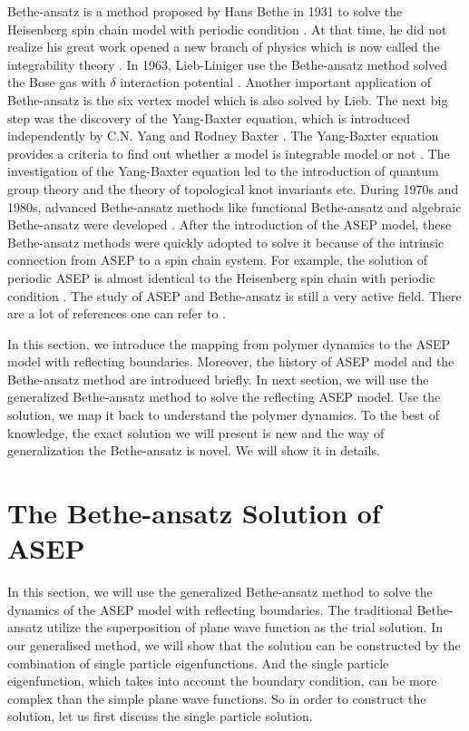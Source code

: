 Bethe-ansatz is a method proposed by Hans Bethe in 1931 to solve the Heisenberg spin chain model with periodic condition \cite{Bethe1931}. At that time, he did not realize his great work opened a new branch of physics which is now called the integrability theory \cite{Batchelor2007}. In 1963, Lieb-Liniger use the Bethe-ansatz method solved the Bose gas with $\delta$ interaction potential \cite{Lieb1963a,Lieb1963}. Another important application of Bethe-ansatz is the six vertex model which is also solved by Lieb. The next big step was the discovery of the Yang-Baxter equation, which is introduced independently by C.N. Yang and Rodney Baxter \cite{Yang1967,Baxter1972}. The Yang-Baxter equation provides a criteria to find out whether a model is integrable model or not \cite{Batchelor2007}. The investigation of the Yang-Baxter equation led to the introduction of quantum group theory and the theory of topological knot invariants etc. During 1970s and 1980s, advanced Bethe-ansatz methods like functional Bethe-ansatz  and algebraic Bethe-ansatz were developed \cite{Mallick2011b}. After the introduction of the ASEP model, these Bethe-ansatz methods were quickly adopted to solve it because of the intrinsic connection from ASEP to a spin chain system. For example, the solution of periodic ASEP is almost identical to the Heisenberg spin chain with periodic condition \cite{Mallick2011b}. The study of ASEP and Bethe-ansatz is still a very active field. There are a lot of references one can refer to \cite{Derrida1998,Liggett1999,Schutz2001,Golinelli2006,Mallick2011b}. 

In this section, we introduce the mapping from polymer dynamics to the ASEP model with reflecting boundaries. Moreover, the history of ASEP model and the Bethe-ansatz method are introduced briefly. In next section, we will use the generalized Bethe-ansatz method to solve the reflecting ASEP model. Use the solution, we map it back to understand the polymer dynamics. To the best of knowledge, the exact solution we will present is new and the way of generalization the Bethe-ansatz is novel. We will show it in details. 


\section{The Bethe-ansatz Solution of ASEP}
\label{sec:the_bethe_ansatz_solution_of_asep}
In this section, we will use the generalized Bethe-ansatz method to solve the dynamics of the ASEP model with reflecting boundaries. The traditional Bethe-ansatz utilize the superposition of plane wave function as the trial solution. In our generalised method, we will show that the solution can be constructed by the combination of single particle eigenfunctions. And the single particle eigenfunction, which takes into account the boundary condition, can be more complex than the simple plane wave functions. So in order to construct the solution, let us first discuss the single particle solution.

